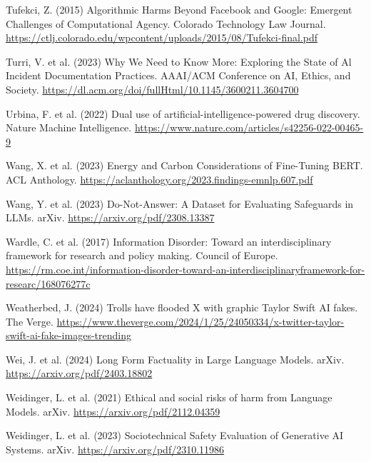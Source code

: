 \documentclass[10pt]{article}
\begin{document}
Tufekci, Z. (2015) Algorithmic Harms Beyond Facebook and Google: Emergent Challenges of Computational Agency. Colorado Technology Law Journal. \href{https://ctlj.colorado.edu/wpcontent/uploads/2015/08/Tufekci-final.pdf}{https://ctlj.colorado.edu/wpcontent/uploads/2015/08/Tufekci-final.pdf}

Turri, V. et al. (2023) Why We Need to Know More: Exploring the State of Al Incident Documentation Practices. AAAI/ACM Conference on AI, Ethics, and Society. \href{https://dl.acm.org/doi/fullHtml/10.1145/3600211.3604700}{https://dl.acm.org/doi/fullHtml/10.1145/3600211.3604700}

Urbina, F. et al. (2022) Dual use of artificial-intelligence-powered drug discovery. Nature Machine Intelligence. \href{https://www.nature.com/articles/s42256-022-00465-9}{https://www.nature.com/articles/s42256-022-00465-9}

Wang, X. et al. (2023) Energy and Carbon Considerations of Fine-Tuning BERT. ACL Anthology. \href{https://aclanthology.org/2023.findings-emnlp.607.pdf}{https://aclanthology.org/2023.findings-emnlp.607.pdf}

Wang, Y. et al. (2023) Do-Not-Answer: A Dataset for Evaluating Safeguards in LLMs. arXiv. \href{https://arxiv.org/pdf/2308.13387}{https://arxiv.org/pdf/2308.13387}

Wardle, C. et al. (2017) Information Disorder: Toward an interdisciplinary framework for research and policy making. Council of Europe. \href{https://rm.coe.int/information-disorder-toward-an-interdisciplinaryframework-for-researc/168076277c}{https://rm.coe.int/information-disorder-toward-an-interdisciplinaryframework-for-researc/168076277c}

Weatherbed, J. (2024) Trolls have flooded X with graphic Taylor Swift AI fakes. The Verge. \href{https://www.theverge.com/2024/1/25/24050334/x-twitter-taylor-swift-ai-fake-images-trending}{https://www.theverge.com/2024/1/25/24050334/x-twitter-taylor-swift-ai-fake-images-trending}

Wei, J. et al. (2024) Long Form Factuality in Large Language Models. arXiv. \href{https://arxiv.org/pdf/2403.18802}{https://arxiv.org/pdf/2403.18802}

Weidinger, L. et al. (2021) Ethical and social risks of harm from Language Models. arXiv. \href{https://arxiv.org/pdf/2112.04359}{https://arxiv.org/pdf/2112.04359}

Weidinger, L. et al. (2023) Sociotechnical Safety Evaluation of Generative AI Systems. arXiv. \href{https://arxiv.org/pdf/2310.11986}{https://arxiv.org/pdf/2310.11986}
\end{document}
